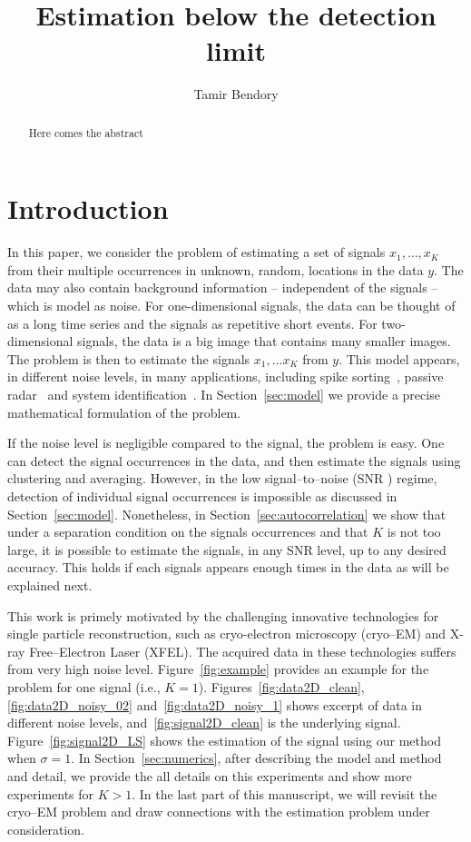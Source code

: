 \documentclass[english]{article}
\numberwithin{equation}{section}
\theoremstyle{plain}
\theoremstyle{definition}
\theoremstyle{remark}
\theoremstyle{plain}
\theoremstyle{remark}
\theoremstyle{plain}
\theoremstyle{plain}
\newcommand{\SNR}{\textsf{SNR} }
\begin{document}
\title{Estimation below the detection limit}


\author{Tamir Bendory}
\maketitle

\begin{abstract}
	Here comes the abstract
\end{abstract}

\section{Introduction}

In this paper, we consider the problem of estimating a set of signals $x_1,\ldots,x_K$ from their multiple occurrences in unknown, random, locations in the data $y$. The data may also contain background information -- independent of the signals -- which is model as noise.
For one-dimensional signals, the data can be thought of as a long time series and the signals as repetitive short events. For two-dimensional signals, the data is a big image that contains many smaller images.  
The problem is then to estimate the signals $x_1,\ldots x_K$ from $y$. This
model appears, in different noise levels, in many applications, including spike sorting~\cite{lewicki1998review}, passive radar~\cite{gogineni2017passive} and system identification~\cite{ljung1998system}.
In Section~\ref{sec:model} we provide a precise mathematical formulation of the problem.


If the noise level is negligible compared to the signal, the problem is easy.
One can detect the signal occurrences in the data, and then estimate the signals using clustering and averaging. However, in the low signal--to--noise (\SNR) regime, detection of individual signal occurrences is impossible as discussed in Section~\ref{sec:model}. Nonetheless, in Section~\ref{sec:autocorrelation} we show that under a separation condition on the signals occurrences and that $K$ is not too large, it is possible to estimate the signals, in any \SNR level, up to any desired accuracy.
This holds if each signals appears enough times in the data as will be explained next.

This work is primely motivated by the challenging innovative technologies for single particle reconstruction, such as cryo-electron microscopy (cryo--EM) and X-ray Free--Electron Laser (XFEL). The acquired data in these technologies suffers from very high noise level. Figure~\ref{fig:example} provides an example for the problem for one signal (i.e., $K=1$). Figures~\ref{fig:data2D_clean},\ref{fig:data2D_noisy_02} and~\ref{fig:data2D_noisy_1} shows excerpt of data in different noise levels, and~\ref{fig:signal2D_clean} is the underlying signal. Figure~\ref{fig:signal2D_LS} shows the estimation of the signal using our method when $\sigma=1$. In Section~\ref{sec:numerics}, after describing the model and method and detail, we provide the all details on this experiments and show more experiments for $K>1$.
In the last part of this manuscript, we will revisit the cryo--EM problem and draw connections with the estimation problem under consideration.
\end{document}
